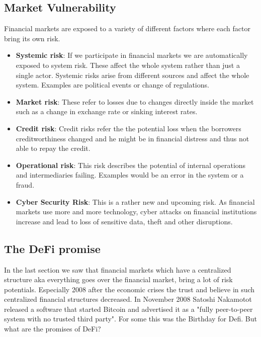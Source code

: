 \documentclass{article}
\begin{document}
\subsection{Market Vulnerability} 
Financial markets are exposed to a variety of different factors where each factor bring its own risk.
\begin{itemize}
    \item \textbf{Systemic risk}: If we participate in financial markets we are automatically exposed to system risk. These affect the whole system rather than just a single actor. Systemic risks arise from different sources and affect the whole system. Examples are political events or change of regulations.
    \item \textbf{Market risk}:  These refer to losses due to changes directly inside the market such as a change in exchange rate or sinking  interest rates. 
    
     \item \textbf{Credit risk}:  Credit risks refer the the potential loss when the borrowers creditworthiness changed and he might be in financial distress and thus not able to repay the credit.
    \item \textbf{Operational risk}:  This risk describes the potential of internal operations and intermediaries failing. Examples would be an error in the system or a fraud.
    \item \textbf{Cyber Security Risk}: This is a rather new and upcoming risk. As financial markets use more and more technology, cyber attacks on financial institutions increase and lead to loss of sensitive data, theft and other disruptions. 

\end{itemize}
\subsection{The DeFi promise } 
In the last section we saw that financial markets which have a centralized structure aka everything goes over the financial market, bring a lot of risk potentials. Especially 2008 after the economic crises the trust and believe in such centralized financial structures decreased. In November 2008 Satoshi Nakamotot released a software that started Bitcoin and advertised it as a "fully peer-to-peer system with no trusted third party". For some this was the Birthday for Defi. But what are the promises of DeFi?
\end{document}

